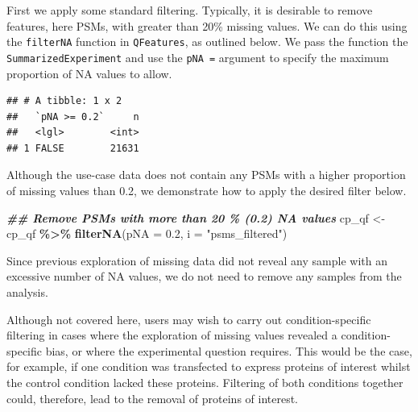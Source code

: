 \documentclass[9pt,a4paper,]{extarticle}
\newenvironment{Shaded}{\begin{snugshade}}{\end{snugshade}}
\newcommand{\AttributeTok}[1]{\textcolor[rgb]{0.13,0.29,0.53}{#1}}
\newcommand{\DocumentationTok}[1]{\textcolor[rgb]{0.56,0.35,0.01}{\textbf{\textit{#1}}}}
\newcommand{\FloatTok}[1]{\textcolor[rgb]{0.00,0.00,0.81}{#1}}
\newcommand{\FunctionTok}[1]{\textcolor[rgb]{0.13,0.29,0.53}{\textbf{#1}}}
\newcommand{\NormalTok}[1]{#1}
\newcommand{\OtherTok}[1]{\textcolor[rgb]{0.56,0.35,0.01}{#1}}
\newcommand{\SpecialCharTok}[1]{\textcolor[rgb]{0.81,0.36,0.00}{\textbf{#1}}}
\newcommand{\StringTok}[1]{\textcolor[rgb]{0.31,0.60,0.02}{#1}}
\begin{document}
First we apply some standard filtering. Typically, it is desirable to remove
features, here PSMs, with greater than 20\% missing values. We can do this using
the \texttt{filterNA} function in \texttt{QFeatures}, as outlined below. We pass the function
the \texttt{SummarizedExperiment} and use the \texttt{pNA\ =} argument to specify the maximum
proportion of NA values to allow.

\begin{Shaded}
\end{Shaded}

\begin{verbatim}
## # A tibble: 1 x 2
##   `pNA >= 0.2`     n
##   <lgl>        <int>
## 1 FALSE        21631
\end{verbatim}

Although the use-case data does not contain any PSMs with a higher proportion
of missing values than 0.2, we demonstrate how to apply the desired filter below.

\begin{Shaded}
\begin{Highlighting}[]
\DocumentationTok{\#\# Remove PSMs with more than 20 \% (0.2) NA values}
\NormalTok{cp\_qf }\OtherTok{\textless{}{-}}\NormalTok{ cp\_qf }\SpecialCharTok{\%\textgreater{}\%} 
  \FunctionTok{filterNA}\NormalTok{(}\AttributeTok{pNA =} \FloatTok{0.2}\NormalTok{, }
           \AttributeTok{i =} \StringTok{"psms\_filtered"}\NormalTok{)}
\end{Highlighting}
\end{Shaded}

Since previous exploration of missing data did not reveal any sample with an
excessive number of NA values, we do not need to remove any samples from the
analysis.

Although not covered here, users may wish to carry out condition-specific
filtering in cases where the exploration of missing values revealed a condition-
specific bias, or where the experimental question requires. This would be the
case, for example, if one condition was transfected to express proteins of
interest whilst the control condition lacked these proteins. Filtering of both
conditions together could, therefore, lead to the removal of proteins of interest.
\end{document}
